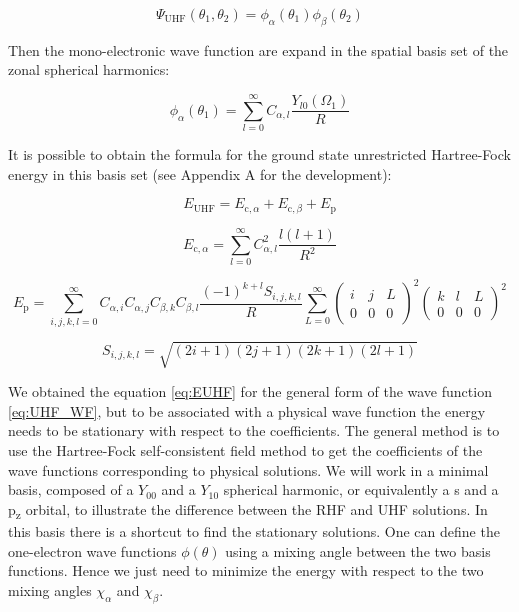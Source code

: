 \documentclass[11pt,a4paper]{article}
\begin{document}
\begin{equation}\label{eq:UHF_WF}
\Psi_{\text{UHF}}(\theta_1,\theta_2)=\phi_\alpha(\theta_1)\phi_\beta(\theta_2)
\end{equation}

Then the mono-electronic wave function are expand in the spatial basis set of the zonal spherical harmonics:

\begin{equation}
\phi_\alpha(\theta_1)=\sum\limits_{l=0}^{\infty}C_{\alpha,l}\frac{Y_{l0}(\Omega_1)}{R}
\end{equation}

It is possible to obtain the formula for the ground state unrestricted Hartree-Fock energy in this basis set (see Appendix A for the development):

\begin{equation}
E_{\text{UHF}} = E_{\text{c},\alpha} + E_{\text{c},\beta} + E_{\text{p}}
\end{equation}

\begin{equation}
E_{\text{c},\alpha} = \sum\limits_{l=0}^{\infty} C_{\alpha,l}^2 \frac{l(l+1)}{R^2}
\end{equation}

\begin{equation}
E_{\text{p}} = \sum\limits_{i,j,k,l=0}^{\infty}C_{\alpha,i}C_{\alpha,j}C_{\beta,k}C_{\beta,l} \frac{(-1)^{k+l}S_{i,j,k,l}}{R}\sum\limits_{L=0}^{\infty} \begin{pmatrix}
 i & j & L \\
 0 & 0 & 0
\end{pmatrix}^2 \begin{pmatrix}
 k & l & L \\
 0 & 0 & 0
\end{pmatrix}^2
\label{eq:EUHF}
\end{equation}

\begin{equation*}
S_{i,j,k,l}=\sqrt{(2i+1)(2j+1)(2k+1)(2l+1)}
\end{equation*}

We obtained the equation \eqref{eq:EUHF} for the general form of the wave function \eqref{eq:UHF_WF}, but to be associated with a physical wave function the energy needs to be stationary with respect to the coefficients. The general method is to use the Hartree-Fock self-consistent field method \cite{SzaboBook} to get the coefficients of the wave functions corresponding to physical solutions. We will work in a minimal basis, composed  of a $Y_{00}$ and a $Y_{10}$ spherical harmonic, or equivalently a s and a p\textsubscript{z} orbital, to illustrate the difference between the RHF and UHF solutions. In this basis there is a shortcut to find the stationary solutions. One can define the one-electron wave functions $\phi(\theta)$ using a mixing angle between the two basis functions. Hence we just need to minimize the energy with respect to the two mixing angles $\chi_\alpha$ and $\chi_\beta$.
\end{document}
